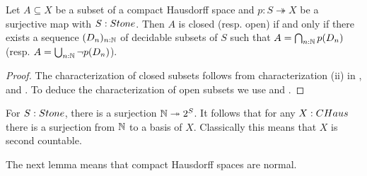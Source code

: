 \begin{corollary}\label{CompactHausdorffTopology}
Let $A\subseteq X$ be a subset of a compact Hausdorff space and $p:S\twoheadrightarrow X$ be a surjective map with $S:\Stone$. Then $A$ is closed (resp. open) if and only if there exists a sequence $(D_n)_{n:\mathbb{N}}$ of decidable subsets of $S$ such that $A = \bigcap_{n:\mathbb{N}} p(D_n)$ (resp. $A = \bigcup_{n:\mathbb{N}} \neg p(D_n)$).
\end{corollary}
\begin{proof}
  The characterization of closed subsets follows from characterization (ii) in , 
  and . 
  To deduce the characterization of open subsets we use  and
  .
\end{proof}
%
\begin{remark}
  For $S:\Stone$, there is a surjection $\mathbb{N}\twoheadrightarrow 2^S$. 
  It follows that for any $X:\CHaus$ there is a surjection from $\mathbb{N}$ to a basis of $X$. 
  Classically this means that $X$ is second countable. 
\end{remark}
%

The next lemma means that compact Hausdorff spaces are normal.

